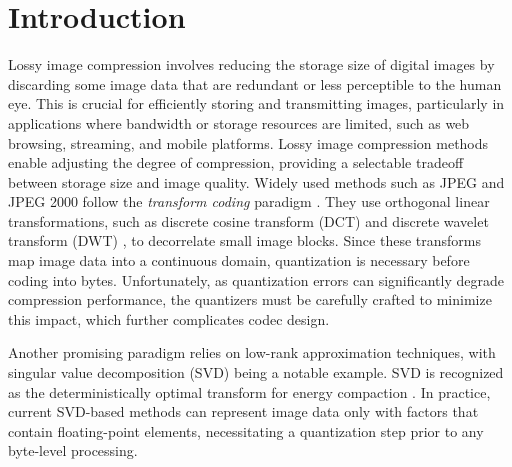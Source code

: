 \section{Introduction} \label{sec:introduction}

Lossy image compression involves reducing the storage size of digital images by discarding some image data that are redundant or less perceptible to the human eye. This is crucial for efficiently storing and transmitting images, particularly in applications where bandwidth or storage resources are limited, such as web browsing, streaming, and mobile platforms. Lossy image compression methods enable adjusting the degree of compression, providing a selectable tradeoff between storage size and image quality. Widely used methods such as JPEG \cite{wallace1991jpeg} and JPEG 2000 \cite{skodras2001jpeg} follow the \emph{transform coding} paradigm \cite{goyal2001theoretical}. They use orthogonal linear transformations, such as discrete cosine transform (DCT) \cite{ahmed1974discrete} and discrete wavelet transform (DWT) \cite{antonini1992image}, to decorrelate small image blocks. Since these transforms map image data into a continuous domain, quantization is necessary before coding into bytes. Unfortunately, as quantization errors can significantly degrade compression performance, the quantizers must be carefully crafted to minimize this impact, which further complicates codec design.

Another promising paradigm relies on low-rank approximation techniques, with singular value decomposition (SVD) being a notable example. SVD is recognized as the deterministically optimal transform for energy compaction \cite{andrews1976singular}. In practice, current SVD-based methods \cite{andrews1976singular, prasantha2007image, hou2015sparse} can represent image data only with factors that contain floating-point elements, necessitating a quantization step prior to any byte-level processing. 

